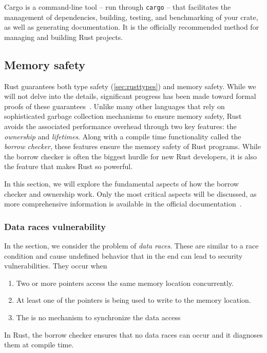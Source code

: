 \documentclass[twoside,11pt]{report}
\theoremstyle{definition}
\theoremstyle{plain}
\begin{document}
Cargo is a command-line tool -- run through \texttt{cargo} -- that facilitates the management of dependencies, building, testing, and benchmarking of your crate, as well as generating documentation. It is the officially recommended method for managing and building Rust projects.


\subsection{Memory safety}\label{sec:rustborrow} %
Rust guarantees both type safety (\autoref{sec:rusttypes}) and memory safety. While we will not delve into the details, significant progress has been made toward formal proofs of these guarantees~\cite{jung2017rustbelt}. Unlike many other languages that rely on sophisticated garbage collection mechanisms to ensure memory safety, Rust avoids the associated performance overhead through two key features: the \textit{ownership} and \textit{lifetimes}. Along with a compile time functionality called the \textit{borrow checker}, these features ensure the memory safety of Rust programs. While the borrow checker is often the biggest hurdle for new Rust developers, it is also the feature that makes Rust so powerful.

In this section, we will explore the fundamental aspects of how the borrow checker and ownership work. Only the most critical aspects will be discussed, as more comprehensive information is available in the official documentation~\cite{rustlangRustProgramming}.

\subsubsection{Data races vulnerability}
In the section, we consider the problem of \textit{data races}. These are similar to a race condition and cause undefined behavior that in the end can lead to security vulnerabilities. They occur when
\begin{enumerate}[parsep=0pt, itemsep=0pt]
  \item Two or more pointers access the same memory location concurrently.
  \item At least one of the pointers is being used to write to the memory location.
  \item The is no mechanism to synchronize the data access
\end{enumerate}
In Rust, the borrow checker ensures that no data races can occur and it diagnoses them at compile time.
\end{document}
